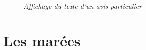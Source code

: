 \begin{center}
\begin{figure}[ht]
\caption{\label{equiProj}\textit{Affichage du texte d'un avis particulier}}
\end{figure}
\end{center}
\chapter{Les marées}
